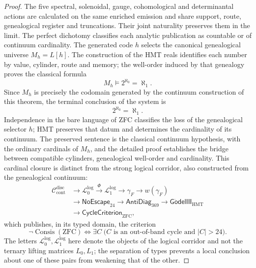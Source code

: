 \begin{proof}
The five spectral, solenoidal, gauge, cohomological and
determinantal actions are calculated on the same enriched emission and share
support, route, genealogical register and truncations. Their joint naturality preserves them
in the limit. The perfect dichotomy classifies each analytic publication
as countable or of continuum cardinality. The generated code \(h\) selects
the canonical genealogical universe \(M_h=L[h]\). The construction of the
HMT reals identifies each number by value, cylinder, route and memory; the
well-order induced by that genealogy proves the classical formula
\[
M_h\models2^{\aleph_0}=\aleph_1.
\]
Since \(M_h\) is precisely the codomain generated by the continuum
construction of this theorem, the terminal conclusion of the system is
\[
 \boxed{2^{\aleph_0}=\aleph_1.}
\]
Independence in the bare language of ZFC classifies the loss of the
genealogical selector \(h\); HMT preserves that datum and determines the cardinality of
its continuum. The preserved sentence is the classical continuum hypothesis,
with the ordinary cardinals of \(M_h\), and the detailed proof establishes the
bridge between compatible cylinders, genealogical well-order and cardinality.
This cardinal closure is distinct from the strong logical corridor, also
constructed from the genealogical continuum:
\[
\begin{aligned}
 \mathcal C_{\mathrm{cont}}^{\mathrm{disc}}
 &\longrightarrow\mathcal L_0^{\mathrm{log}}
 \xrightarrow{\Phi}\mathcal L_1^{\mathrm{log}}
 \longrightarrow\gamma_F\longrightarrow w(\gamma_F)\\
 &\longrightarrow\mathsf{NoEscape}_{24}
 \longrightarrow\mathsf{AntiDiag}_{369}
 \longrightarrow\mathsf{G\ddot{o}delIII}_{\mathrm{HMT}}\\
 &\longrightarrow\mathsf{CycleCriterion}_{\mathrm{ZFC}},
\end{aligned}
\]
which publishes, in its typed domain, the criterion
\[
 \boxed{
 \neg\operatorname{Consis}(\mathrm{ZFC})
 \Longleftrightarrow
 \exists C\;\bigl(C\text{ is an out-of-band cycle and }|C|>24\bigr).}
\]
The letters \(\mathcal L_0^{\mathrm{log}},\mathcal L_1^{\mathrm{log}}\)
here denote the objects of the logical corridor and not the ternary lifting
matrices \(L_0,L_1\); the separation of types prevents a local
conclusion about one of these pairs from weakening that of the other.


\end{proof}
